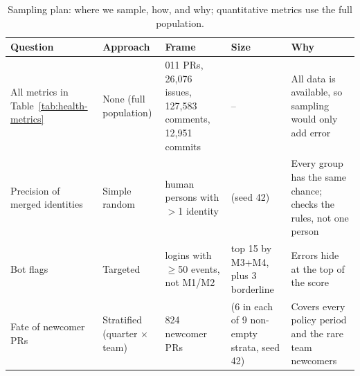 \begin{table}[htbp]
\footnotesize
\setlength{\tabcolsep}{4pt}
\renewcommand{\arraystretch}{1.2}
\caption{Sampling plan: where we sample, how, and why; quantitative metrics use the full population.}
\label{tab:health-sampling}
\begin{tabular}{>{\raggedright\arraybackslash}p{} >{\raggedright\arraybackslash}p{} >{\raggedright\arraybackslash}p{} >{\raggedright\arraybackslash}p{} >{\raggedright\arraybackslash}p{}}
\hline
\textbf{Question} & \textbf{Approach} & \textbf{Frame} & \textbf{Size} & \textbf{Why} \\
\hline
All metrics in Table~\ref{tab:health-metrics} & None (full population) & 22{,}011 PRs, 26{,}076 issues, 127{,}583 comments, 12{,}951 commits & -- & All data is available, so sampling would only add error \\
Precision of merged identities & Simple random & human persons with $>$1 identity & 30 (seed 42) & Every group has the same chance; checks the rules, not one person \\
Bot flags & Targeted & logins with $\geq$50 events, not M1/M2 & top 15 by M3+M4, plus 3 borderline & Errors hide at the top of the score \\
Fate of newcomer PRs & Stratified (quarter $\times$ team) & 16{,}824 newcomer PRs & 54 (6 in each of 9 non-empty strata, seed 42) & Covers every policy period and the rare team newcomers \\
\hline
\end{tabular}
\end{table}
